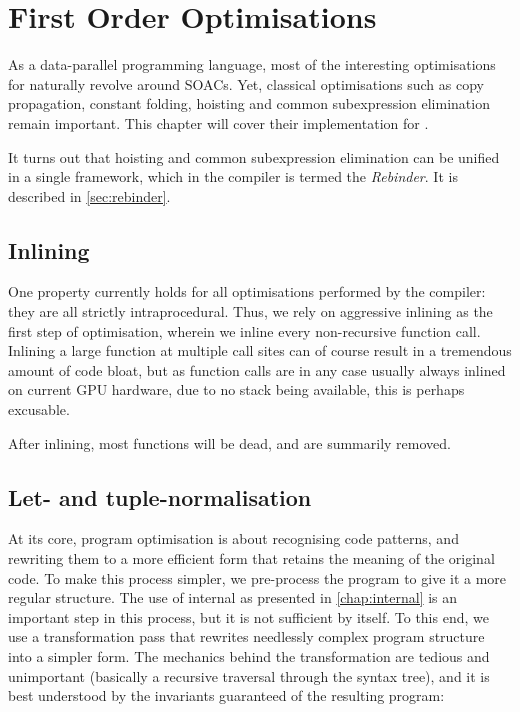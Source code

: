 \chapter{First Order Optimisations}
\label{chap:first-order-optimisations}

As a data-parallel programming language, most of the interesting
optimisations for \LO{} naturally revolve around SOACs.  Yet,
classical optimisations such as copy propagation, constant folding,
hoisting and common subexpression elimination remain important.  This
chapter will cover their implementation for \LO{}.

It turns out that hoisting and common subexpression elimination can be
unified in a single framework, which in the \LO{} compiler is termed
the \textit{Rebinder}.  It is described in \cref{sec:rebinder}.

\section{Inlining}

One property currently holds for all optimisations performed by the
\LO{} compiler: they are all strictly intraprocedural.  Thus, we rely
on aggressive inlining as the first step of optimisation, wherein we
inline every non-recursive function call.  Inlining a large function
at multiple call sites can of course result in a tremendous amount of
code bloat, but as function calls are in any case usually always
inlined on current GPU hardware, due to no stack being available, this
is perhaps excusable.

After inlining, most functions will be dead, and are summarily
removed.

\section{Let- and tuple-normalisation}
\label{sec:let-normalisation}

At its core, program optimisation is about recognising code patterns,
and rewriting them to a more efficient form that retains the meaning
of the original code.  To make this process simpler, we pre-process
the program to give it a more regular structure.  The use of internal
\LO{} as presented in \cref{chap:internal} is an important step in
this process, but it is not sufficient by itself.  To this end, we use
a transformation pass that rewrites needlessly complex program
structure into a simpler form.  The mechanics behind the
transformation are tedious and unimportant (basically a recursive
traversal through the syntax tree), and it is best understood by the
invariants guaranteed of the resulting program:

